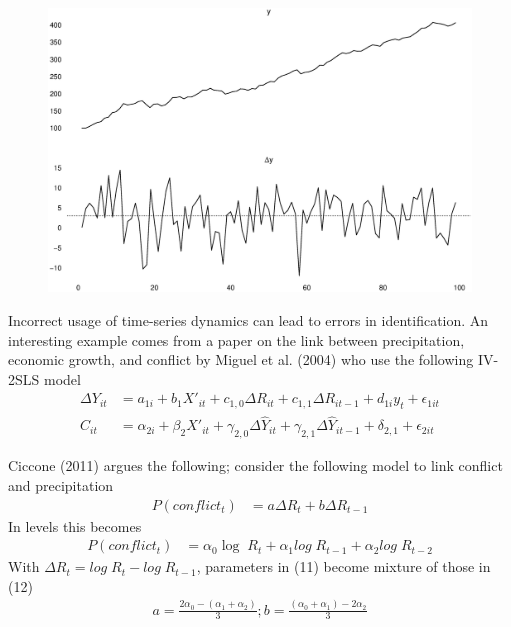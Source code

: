 \documentclass{beamer}
\begin{document}
\begin{frame}
  \begin{figure}
    \includegraphics[scale=.3]{detrending_issue.eps}
  \end{figure}
\end{frame}

\begin{frame}
  Incorrect usage of time-series dynamics can lead to errors in identification. 
  An interesting example comes from a paper on the link between precipitation, economic growth, and conflict by Miguel et al. (2004) who use the following IV-2SLS model
  \begin{align}
    \Delta Y_{it} &= a_{1i} + b_1X'_{it} + c_{1,0}\Delta R_{it} + c_{1,1} \Delta R_{it-1} + d_{1i}y_t +\epsilon_{1it}\\
    C_{it} &= \alpha_{2i} + \beta_2 X'_{it} + \gamma_{2,0} \Delta \hat{Y}_{it} + \gamma_{2,1} \Delta \hat{Y}_{it-1} + \delta_{2,1} + \epsilon_{2it}
  \end{align}  
\end{frame}


\begin{frame}
  Ciccone (2011) argues the following; consider the following model to link conflict and precipitation   
  \begin{align}
    P(conflict_t) &= a \Delta R_t + b \Delta R_{t-1}  
  \end{align}
  \medskip
  In levels this becomes
  \begin{align}
    P(conflict_t) &= \alpha_0\log\; R_t + \alpha_1 log\; R_{t-1} + \alpha_2 log\; R_{t-2}  
  \end{align}
  \medskip
  With   $\Delta R_t = log\;R_t - log\; R_{t-1}$, parameters in (11) become mixture of those in (12)
  \begin{align}
    a=\frac{2\alpha_0-(\alpha_1+\alpha_2)}{3}; b=\frac{(\alpha_0 + \alpha_1)-2\alpha_2}{3}      
    \end{align}  
\end{frame}
\end{document}
